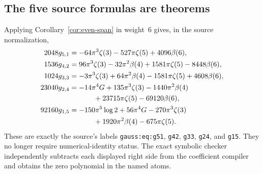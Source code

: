 \documentclass[11pt,a4paper]{article}
\numberwithin{equation}{section}
\theoremstyle{definition}
\theoremstyle{remark}
\begin{document}
\subsection{The five source formulas are theorems}
Applying Corollary~\ref{cor:even-span} in weight~6 gives, in the source normalization,
\begin{align}
 2048g_{5,1}&=-64\pi^3\zeta(3)-527\pi\zeta(5)+4096\beta(6),\label{eq:g51}\\
 1536g_{4,2}&=96\pi^3\zeta(3)-32\pi^2\beta(4)
              +1581\pi\zeta(5)-8448\beta(6),\label{eq:g42}\\
 1024g_{3,3}&=-3\pi^3\zeta(3)+64\pi^2\beta(4)
              -1581\pi\zeta(5)+4608\beta(6),\label{eq:g33}\\
 23040g_{2,4}&=-14\pi^4G+135\pi^3\zeta(3)-1440\pi^2\beta(4)\notag\\
             &\hspace{12mm}+23715\pi\zeta(5)-69120\beta(6),\label{eq:g24}\\
 92160g_{1,5}&=-150\pi^5\log2+56\pi^4G-270\pi^3\zeta(3)\notag\\
             &\hspace{12mm}+1920\pi^2\beta(4)-675\pi\zeta(5).\label{eq:g15}
\end{align}
These are exactly the source's labels \texttt{gauss:eq:g51}, \texttt{g42}, \texttt{g33}, \texttt{g24}, and \texttt{g15}. They no longer require numerical-identity status. The exact symbolic checker independently subtracts each displayed right side from the coefficient compiler and obtains the zero polynomial in the named atoms.
\end{document}
